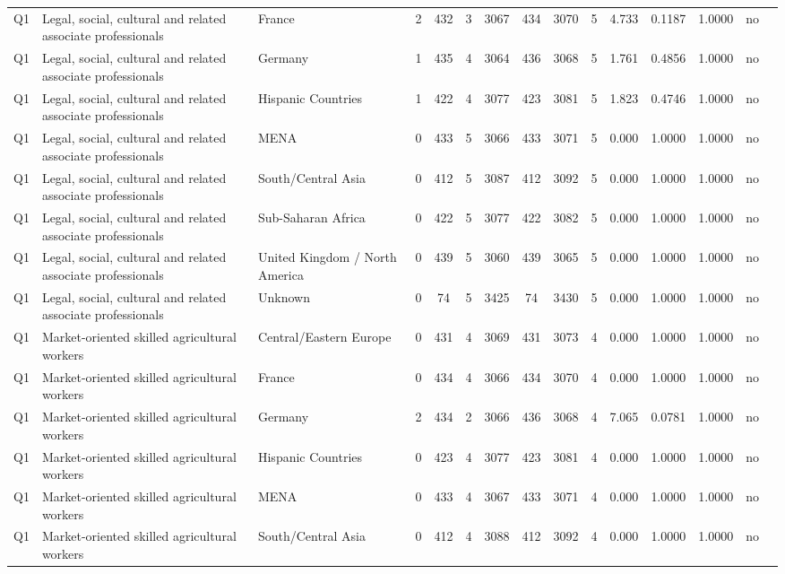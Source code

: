 \begin{longtable}{lllrcccccccccll}
Q1 & Legal, social, cultural and related associate professionals & France & 2 & 432 & 3 & 3067 & 434 & 3070 & 5 & 4.733 & 0.1187 & 1.0000 & no \\
Q1 & Legal, social, cultural and related associate professionals & Germany & 1 & 435 & 4 & 3064 & 436 & 3068 & 5 & 1.761 & 0.4856 & 1.0000 & no \\
Q1 & Legal, social, cultural and related associate professionals & Hispanic Countries & 1 & 422 & 4 & 3077 & 423 & 3081 & 5 & 1.823 & 0.4746 & 1.0000 & no \\
Q1 & Legal, social, cultural and related associate professionals & MENA & 0 & 433 & 5 & 3066 & 433 & 3071 & 5 & 0.000 & 1.0000 & 1.0000 & no \\
Q1 & Legal, social, cultural and related associate professionals & South/Central Asia & 0 & 412 & 5 & 3087 & 412 & 3092 & 5 & 0.000 & 1.0000 & 1.0000 & no \\
Q1 & Legal, social, cultural and related associate professionals & Sub-Saharan Africa & 0 & 422 & 5 & 3077 & 422 & 3082 & 5 & 0.000 & 1.0000 & 1.0000 & no \\
Q1 & Legal, social, cultural and related associate professionals & United Kingdom / North America & 0 & 439 & 5 & 3060 & 439 & 3065 & 5 & 0.000 & 1.0000 & 1.0000 & no \\
Q1 & Legal, social, cultural and related associate professionals & Unknown & 0 & 74 & 5 & 3425 & 74 & 3430 & 5 & 0.000 & 1.0000 & 1.0000 & no \\
Q1 & Market-oriented skilled agricultural workers & Central/Eastern Europe & 0 & 431 & 4 & 3069 & 431 & 3073 & 4 & 0.000 & 1.0000 & 1.0000 & no \\
Q1 & Market-oriented skilled agricultural workers & France & 0 & 434 & 4 & 3066 & 434 & 3070 & 4 & 0.000 & 1.0000 & 1.0000 & no \\
Q1 & Market-oriented skilled agricultural workers & Germany & 2 & 434 & 2 & 3066 & 436 & 3068 & 4 & 7.065 & 0.0781 & 1.0000 & no \\
Q1 & Market-oriented skilled agricultural workers & Hispanic Countries & 0 & 423 & 4 & 3077 & 423 & 3081 & 4 & 0.000 & 1.0000 & 1.0000 & no \\
Q1 & Market-oriented skilled agricultural workers & MENA & 0 & 433 & 4 & 3067 & 433 & 3071 & 4 & 0.000 & 1.0000 & 1.0000 & no \\
Q1 & Market-oriented skilled agricultural workers & South/Central Asia & 0 & 412 & 4 & 3088 & 412 & 3092 & 4 & 0.000 & 1.0000 & 1.0000 & no \\

\end{longtable}
